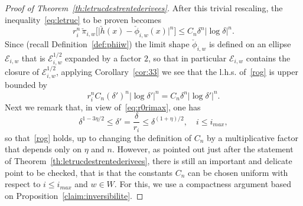 \documentclass[AHL,Unicode,longabstracts,published]{cedram}
\newcommand{\clE}{\mathcal{E}}
\begin{document}
\begin{proof}[Proof of Theorem~\ref{th:letrucdestrentederivees}]
After this trivial rescaling, the inequality~\eqref{eq:letruc} to be proven becomes
\begin{equation}\label{rog}
r_i^n\,\check \pi_{i,w}\Big[\big|\check h(x)-\check\phi_{i,w}(x)\big|^n\Big]\le C_n \delta^n|\log \delta|^n.
\end{equation}
Since (recall Definition~\ref{def:phiiw}) the limit shape $\check \phi_{i,w}$ is defined on an ellipse $\clE_{i,w}$ that is $\clE^{1/2}_{i,w}$ expanded by a factor $2$, so that in particular $\clE_{i,w}$ contains the closure of $\clE^{1/2}_{i,w}$, applying Corollary~\ref{cor:33} we see that the l.h.s. of~\eqref{rog} is upper bounded by
\begin{equation}
r_i^n C_n (\delta')^n \left|\log \delta'\right|^n= C_n \delta^n \left|\log \delta'\right|^n.
\end{equation}
Next we remark that, in view of~\eqref{eq:r0rimax}, one has
\begin{equation}
\delta^{1-3\eta/2} \le \delta'=\frac{\delta}{r_i}\le \delta^{(1+\eta)/2}, \quad i\le i_{max},
\end{equation}
so that~\eqref{rog} holds, up to changing the definition of $C_n$ by a multiplicative factor that depends only on $\eta$ and $n$. However, as pointed out just after the statement of Theorem~\ref{th:letrucdestrentederivees}, there is still an important and delicate point to be checked, that is that the constants $C_n$ can be chosen uniform with respect to $i\le i_{max}$ and $w\in W$. For this, we use a compactness argument based on Proposition~\ref{claim:inversibilite}.


\end{proof}
\end{document}
